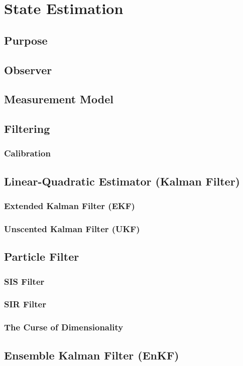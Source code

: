 \documentclass[../notes.tex]{subfiles}
\begin{document}
\section{State Estimation}
\subsection{Purpose}
\subsection{Observer}
\subsection{Measurement Model}
\subsection{Filtering}
\subsubsection{Calibration}
\subsection{Linear-Quadratic Estimator (Kalman Filter)}
\subsubsection{Extended Kalman Filter (EKF)}
\subsubsection{Unscented Kalman Filter (UKF)}
\subsection{Particle Filter}
\subsubsection{SIS Filter}
\subsubsection{SIR Filter}
\subsubsection{The Curse of Dimensionality}
\subsection{Ensemble Kalman Filter (EnKF)}
\end{document}
